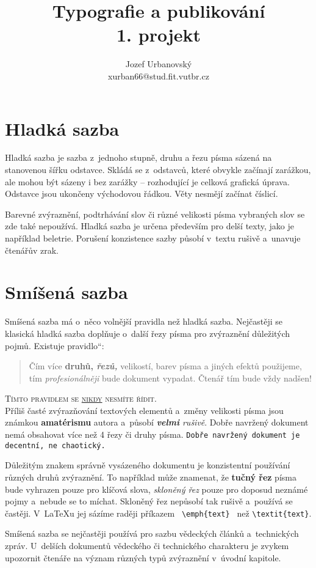 \documentclass[a4paper,11pt, twocolumn]{article}
\title{Typografie a publikování\\ 1. projekt}
\author{Jozef Urbanovský\\ xurban66@stud.fit.vutbr.cz}
\date{}
\newcommand\quot[1]{\quotedblbase #1\textquotedblleft}
\begin{document}
\maketitle

\section{Hladká sazba}
{Hladká sazba je sazba z~jednoho stupně, druhu a řezu pí­sma sázená na stanovenou šířku odstavce. Skládá se z~odstavců, které obvykle začínají­ zarážkou, ale mohou být sázeny i bez zarážky -- rozhodují­cí­ je celková grafická úprava. Odstavce jsou ukončeny východovou řádkou. Věty nesmějí začínat číslicí.\par
Barevné zvýraznění­, podtrhávání­ slov či různé velikosti písma vybraných slov se zde také nepoužívá. Hladká sazba je určena především pro delší­ texty, jako je napří­klad beletrie. Porušení­ konzistence sazby \-působí v~textu rušivě a~unavuje čtenářův zrak.}

\section{Smíšená sazba}
{Smíšená sazba má o~něco volnější­ pravidla než hladká sazba. Nejčastěji se klasická hladká sazba doplňuje o~další řezy pí­sma pro zvýraznění­ důležitých pojmů. Existuje \quot{pravidlo}:
\begin{quotation}Čím více \textbf{druhů, \emph{řezů,}} {\scriptsize velikostí}, barev pí\-sma a jiných efektů použijeme, tím \emph{profe\-sionálněji} bude dokument vypadat. Čtenář tím bude vždy {\huge nadšen!}\end{quotation}\par
\textsc{Tímto pravidlem se \underline{nikdy} nesmíte řídit.}\\ Příliš časté zvýrazňování textových elementů a~změny velikosti {\tiny písma} {\Large jsou} {\LARGE známkou} \textbf{\huge{amatéris\-mu}} autora a~působí \emph{\textbf{velmi} rušivě}. Dobře navrže\-ný dokument nemá obsahovat více než 4 řezy či druhy písma. {\tt Dobře navržený dokument je decentní, ne chaotický.}\par
Důležitým znakem správně vysázeného dokumentu je konzistentní používání různých druhů zvýraznění. To například může znamenat, že \textbf{tučný řez} písma bude vyhrazen pouze pro klíčová slova, \textsl{skloněný řez} pouze pro doposud neznámé pojmy a~nebude se to míchat. Skloněný řez nepůsobí tak rušivě a~používá se častěji. V~\LaTeX u jej sázíme raději příkazem \verb$ \emph{text} $ než \verb$\textit{text}$.\par
Smíšená sazba se nejčastěji používá pro sazbu vědeckých článků a~technických zpráv. U~delších dokumentů vědeckého či technického charakteru je zvykem upozornit čtenáře na význam různých typů zvýraznění v~úvodní kapitole.}
\end{document}
